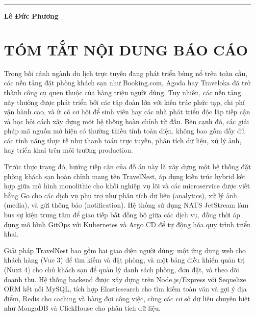 \documentclass[13pt,a4paper,twoside]{report}
\begin{document}
\vspace{1cm}
\begin{flushright}
  \begin{minipage}{5cm}
    \centering
    \hrule
    \textbf{Lê Đức Phương}
  \end{minipage}
\end{flushright}

\newpage

\chapter*{TÓM TẮT NỘI DUNG BÁO CÁO}

Trong bối cảnh ngành du lịch trực tuyến đang phát triển bùng nổ trên toàn cầu, các nền tảng đặt phòng khách sạn như Booking.com, Agoda hay Traveloka đã trở thành công cụ quen thuộc của hàng triệu người dùng. Tuy nhiên, các nền tảng này thường được phát triển bởi các tập đoàn lớn với kiến trúc phức tạp, chi phí vận hành cao, và ít có cơ hội để sinh viên hay các nhà phát triển độc lập tiếp cận và học hỏi cách xây dựng một hệ thống hoàn chỉnh từ đầu. Bên cạnh đó, các giải pháp mã nguồn mở hiện có thường thiếu tính toàn diện, không bao gồm đầy đủ các tính năng thực tế như thanh toán trực tuyến, phân tích dữ liệu, xử lý ảnh, hay triển khai trên môi trường production.

Trước thực trạng đó, hướng tiếp cận của đồ án này là xây dựng một hệ thống đặt phòng khách sạn hoàn chỉnh mang tên TravelNest, áp dụng kiến trúc hybrid kết hợp giữa mô hình monolithic cho khối nghiệp vụ lõi và các microservice được viết bằng Go cho các dịch vụ phụ trợ như phân tích dữ liệu (analytics), xử lý ảnh (media), và gửi thông báo (notification). Hệ thống sử dụng NATS JetStream làm bus sự kiện trung tâm để giao tiếp bất đồng bộ giữa các dịch vụ, đồng thời áp dụng mô hình GitOps với Kubernetes và Argo CD để tự động hóa quy trình triển khai.

Giải pháp TravelNest bao gồm hai giao diện người dùng: một ứng dụng web cho khách hàng (Vue 3) để tìm kiếm và đặt phòng, và một bảng điều khiển quản trị (Nuxt 4) cho chủ khách sạn để quản lý danh sách phòng, đơn đặt, và theo dõi doanh thu. Hệ thống backend được xây dựng trên Node.js/Express với Sequelize ORM kết nối MySQL, tích hợp Elasticsearch cho tìm kiếm toàn văn và gợi ý địa điểm, Redis cho caching và hàng đợi công việc, cùng các cơ sở dữ liệu chuyên biệt như MongoDB và ClickHouse cho phân tích dữ liệu.
\end{document}
